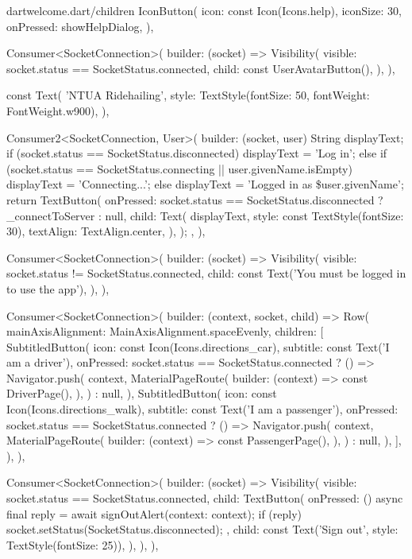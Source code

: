 \documentclass[../thesis.tex]{subfiles}
\begin{document}
\begin{codeblock}{dart}{welcome.dart/children}
  IconButton(
    icon: const Icon(Icons.help),
    iconSize: 30,
    onPressed: showHelpDialog,
  ),

  Consumer<SocketConnection>(
    builder: (socket) => Visibility(
      visible: socket.status == SocketStatus.connected,
      child: const UserAvatarButton(),
    ),
  ),

  const Text(
    'NTUA Ridehailing',
    style: TextStyle(fontSize: 50, fontWeight: FontWeight.w900),
  ),

  Consumer2<SocketConnection, User>(
    builder: (socket, user) {
      String displayText;
      if (socket.status == SocketStatus.disconnected) {
        displayText = 'Log in';
      } else if (socket.status == SocketStatus.connecting ||
          user.givenName.isEmpty) {
        displayText = 'Connecting...';
      } else {
        displayText = 'Logged in as \${user.givenName}';
      }
      return TextButton(
        onPressed: socket.status == SocketStatus.disconnected
            ? _connectToServer
            : null,
        child: Text(
          displayText,
          style: const TextStyle(fontSize: 30),
          textAlign: TextAlign.center,
        ),
      );
    },
  ),

  Consumer<SocketConnection>(
    builder: (socket) => Visibility(
      visible: socket.status != SocketStatus.connected,
      child: const Text('You must be logged in to use the app'),
    ),
  ),

  Consumer<SocketConnection>(
    builder: (context, socket, child) => Row(
      mainAxisAlignment: MainAxisAlignment.spaceEvenly,
      children: [
        SubtitledButton(
          icon: const Icon(Icons.directions_car),
          subtitle: const Text('I am a driver'),
          onPressed: socket.status == SocketStatus.connected
              ? () => Navigator.push(
                context,
                MaterialPageRoute(
                  builder: (context) => const DriverPage(),
                ),
              )
              : null,
        ),
        SubtitledButton(
          icon: const Icon(Icons.directions_walk),
          subtitle: const Text('I am a passenger'),
          onPressed: socket.status == SocketStatus.connected
              ? () => Navigator.push(
                context,
                MaterialPageRoute(
                  builder: (context) => const PassengerPage(),
                ),
              )
              : null,
        ),
      ],
    ),
  ),

  Consumer<SocketConnection>(
    builder: (socket) => Visibility(
      visible: socket.status == SocketStatus.connected,
      child: TextButton(
        onPressed: () async {
          final reply = await signOutAlert(context: context);
          if (reply) socket.setStatus(SocketStatus.disconnected);
        },
        child: const Text('Sign out', style: TextStyle(fontSize: 25)),
      ),
    ),
  ),
\end{codeblock}
\end{document}
